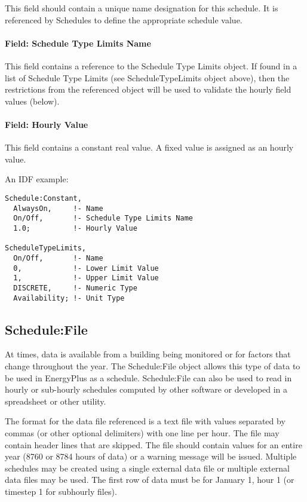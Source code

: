 This field should contain a unique name designation for this schedule. It is referenced by Schedules to define the appropriate schedule value.

\paragraph{Field: Schedule Type Limits Name}\label{field-schedule-type-limits-name-5}

This field contains a reference to the Schedule Type Limits object. If found in a list of Schedule Type Limits (see ScheduleTypeLimits object above), then the restrictions from the referenced object will be used to validate the hourly field values (below).

\paragraph{Field: Hourly Value}\label{field-hourly-value}

This field contains a constant real value. A fixed value is assigned as an hourly value.

An IDF example:

\begin{lstlisting}
Schedule:Constant,
  AlwaysOn,     !- Name
  On/Off,       !- Schedule Type Limits Name
  1.0;          !- Hourly Value

ScheduleTypeLimits,
  On/Off,       !- Name
  0,            !- Lower Limit Value
  1,            !- Upper Limit Value
  DISCRETE,     !- Numeric Type
  Availability; !- Unit Type
\end{lstlisting}

\subsection{Schedule:File}\label{schedulefile}

At times, data is available from a building being monitored or for factors that change throughout the year. The Schedule:File object allows this type of data to be used in EnergyPlus as a schedule. Schedule:File can also be used to read in hourly or sub-hourly schedules computed by other software or developed in a spreadsheet or other utility.

The format for the data file referenced is a text file with values separated by commas (or other optional delimiters) with one line per hour. The file may contain header lines that are skipped. The file should contain values for an entire year (8760 or 8784 hours of data) or a warning message will be issued. Multiple schedules may be created using a single external data file or multiple external data files may be used. The first row of data must be for January 1, hour 1 (or timestep 1 for subhourly files).

